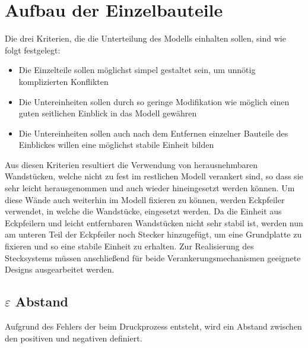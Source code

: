 \section{Aufbau der Einzelbauteile}
Die drei Kriterien, die die Unterteilung des Modells einhalten sollen, sind wie folgt festgelegt:\\
\begin{itemize}
	\item Die Einzelteile sollen möglichst simpel gestaltet sein, um unnötig komplizierten Konflikten
	\item Die Untereinheiten sollen durch so geringe Modifikation wie möglich einen guten seitlichen Einblick in das Modell gewähren
	\item Die Untereinheiten sollen auch nach dem Entfernen einzelner Bauteile des Einblickes willen eine möglichst stabile Einheit bilden
\end{itemize}
Aus diesen Kriterien resultiert die Verwendung von herausnehmbaren Wandstücken, welche nicht zu fest im restlichen Modell verankert sind, so dass sie sehr leicht herausgenommen und auch wieder hineingesetzt werden können.
Um diese Wände auch weiterhin im Modell fixieren zu können, werden Eckpfeiler verwendet, in welche die Wandstücke, eingesetzt werden.
Da die Einheit aus Eckpfeilern und leicht entfernbaren Wandstücken nicht sehr stabil ist, werden nun am unteren Teil der Eckpfeiler noch Stecker hinzugefügt, um eine Grundplatte zu fixieren und so eine stabile Einheit zu erhalten. Zur Realisierung des Stecksystems müssen anschließend für beide Verankerungsmechanismen geeignete Designs ausgearbeitet werden.
\subsection{$\varepsilon$ Abstand}
Aufgrund des Fehlers der beim Druckprozess entsteht, wird ein Abstand zwischen den positiven und negativen definiert. 


